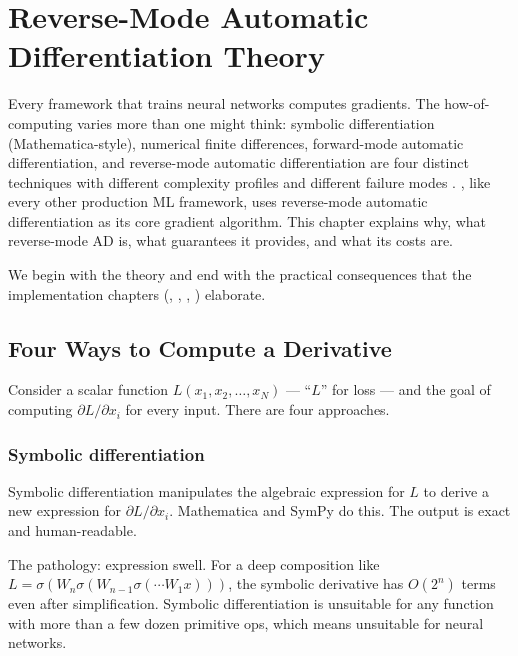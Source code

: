 \chapter{Reverse-Mode Automatic Differentiation Theory}
\label{ch:ad_theory}

Every framework that trains neural networks computes gradients.
The how-of-computing varies more than one might think: symbolic
differentiation (Mathematica-style), numerical finite differences,
forward-mode automatic differentiation, and reverse-mode automatic
differentiation are four distinct techniques with different
complexity profiles and different failure modes
\cite{baydin_automatic_2018,griewank_evaluating_2008}. \Lucid, like every
other production ML framework, uses reverse-mode automatic
differentiation as its core gradient algorithm. This chapter
explains why, what reverse-mode AD is, what guarantees it provides,
and what its costs are.

We begin with the theory and end with the practical consequences
that the implementation chapters
(, ,
, )
elaborate.

\section{Four Ways to Compute a Derivative}
\label{sec:ad_theory:four_ways}

Consider a scalar function $L(x_1, x_2, \ldots, x_N)$ ---
``$L$'' for loss --- and the goal of computing
$\partial L / \partial x_i$ for every input. There are four
approaches.

\subsection{Symbolic differentiation}
\label{ssec:ad_theory:symbolic}

Symbolic differentiation manipulates the algebraic expression for
$L$ to derive a new expression for $\partial L / \partial x_i$.
Mathematica and SymPy do this. The output is exact and
human-readable.

The pathology: expression swell. For a deep composition like
$L = \sigma(W_n \sigma(W_{n-1} \sigma(\cdots W_1 x)))$, the
symbolic derivative has $O(2^n)$ terms even after simplification.
Symbolic differentiation is unsuitable for any function with more
than a few dozen primitive ops, which means unsuitable for
neural networks.


